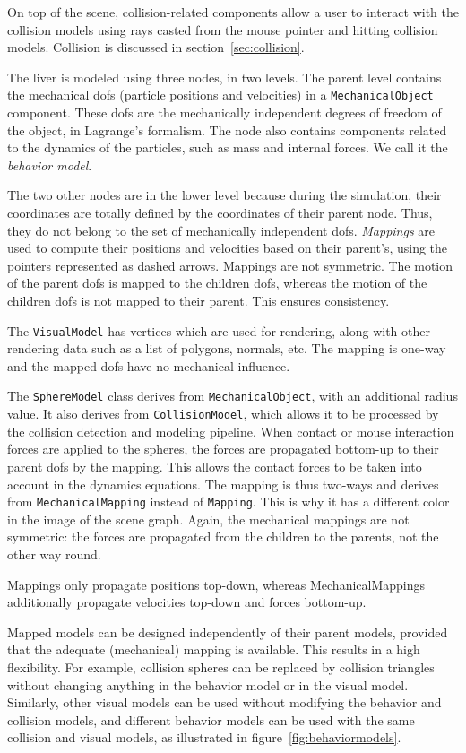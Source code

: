 On top of the scene, collision-related components allow a user to interact with the collision models using rays casted from the mouse pointer and hitting collision models. Collision is discussed in section~\ref{sec:collision}.

The liver is modeled using three nodes, in two levels. The parent level contains the mechanical dofs (particle positions and velocities) in a \texttt{MechanicalObject} component. These dofs are the mechanically independent degrees of freedom of the object, in Lagrange's formalism. The node also contains components related to the dynamics of the particles, such as mass and internal forces. We call it the \textit{behavior model}.

The two other nodes are in the lower level because during the simulation, their coordinates are totally defined by the coordinates of their parent node. Thus, they do not belong to the set of mechanically independent dofs. \emph{Mappings} are used to compute their positions and velocities based on their parent's, using the pointers represented as dashed arrows. Mappings are not symmetric. The motion of the parent dofs is mapped to the children dofs, whereas the motion of the children dofs is not mapped to their parent. This ensures consistency. 

The \texttt{VisualModel} has vertices which are used for rendering, along with other rendering data such as a list of polygons, normals, etc. The mapping is one-way and the mapped dofs have no mechanical influence.

The \texttt{SphereModel} class derives from \texttt{MechanicalObject}, with an additional radius value. It also derives from \texttt{CollisionModel}, which allows it to be processed by the collision detection and modeling pipeline. When contact or mouse interaction forces are applied to the spheres, the forces are propagated bottom-up to their parent dofs by the mapping. This allows the contact forces to be taken into account in the dynamics equations. The mapping is thus two-ways and derives from \texttt{MechanicalMapping} instead of \texttt{Mapping}. This is why it has a different color in the image of the scene graph.
Again, the mechanical mappings are not symmetric: the forces are propagated from the children to the parents, not the other way round. 

Mappings only propagate positions top-down, whereas MechanicalMappings additionally propagate velocities top-down and forces bottom-up. 

Mapped models can be designed independently of their parent models, provided that the adequate (mechanical) mapping is available. This results in a high flexibility. For example, collision spheres can be replaced by collision triangles without changing anything in the behavior model or in the visual model. Similarly, other visual models can be used without modifying the behavior and collision models, and different behavior models can be used with the same collision and visual models, as illustrated in figure~\ref{fig:behaviormodels}.

